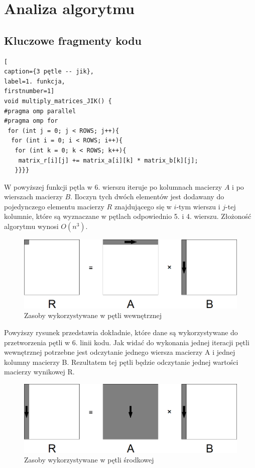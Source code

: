 \documentclass{article}
\begin{document}
\section{Analiza algorytmu}
\subsection{Kluczowe fragmenty kodu}
\begin{lstlisting}[
caption={3 pętle -- jik},
label=1. funkcja,
firstnumber=1]
void multiply_matrices_JIK() {
#pragma omp parallel
#pragma omp for 
 for (int j = 0; j < ROWS; j++){
  for (int i = 0; i < ROWS; i++){
   for (int k = 0; k < ROWS; k++){
    matrix_r[i][j] += matrix_a[i][k] * matrix_b[k][j];
   }}}}
\end{lstlisting}

W powyższej funkcji pętla w 6. wierszu iteruje po kolumnach macierzy $A$ i po wierszach macierzy $B$. Iloczyn tych dwóch elementów jest dodawany do pojedynczego elementu macierzy $R$ znajdującego się w $i$-tym wierszu i $j$-tej kolumnie, które są wyznaczane w pętlach odpowiednio 5. i 4. wierszu. Złożoność algorytmu wynosi $O(n^3)$.

\begin{figure}[H]
	\centering
	\includegraphics[bb=0 0 1280 960]{./images/3/lokIn.png}
	\caption{Zasoby wykorzystywane w pętli wewnętrznej}
	\label{fig:3inner}
\end{figure}

Powyższy rysunek przedstawia dokładnie, które dane są wykorzystywane do przetworzenia pętli w 6. linii kodu. Jak widać do wykonania jednej iteracji pętli wewnętrznej potrzebne jest odczytanie jednego wiersza macierzy A i jednej kolumny macierzy B. Rezultatem tej pętli będzie odczytanie jednej wartości macierzy wynikowej R.

\begin{figure}[H]
	\centering
	\includegraphics[bb=0 0 1280 960]{./images/3/lokMed.png}
	\caption{Zasoby wykorzystywane w pętli środkowej}
	\label{fig:3medium}
\end{figure}
\end{document}
